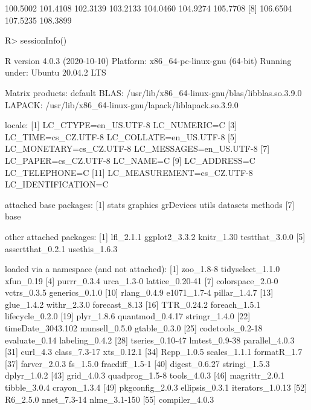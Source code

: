 \documentclass{article}\usepackage[]{graphicx}\usepackage[]{color}
\begin{document}
\begin{Schunk}
% --begin: "frbe"
\begin{Soutput}
 [1] 100.5002 101.4108 102.3139 103.2133 104.0460 104.9274 105.7708
 [8] 106.6504 107.5235 108.3899
\end{Soutput}
%
% --end: "frbe"
\end{Schunk}

\begin{Schunk}
\begin{Sinput}
R> sessionInfo()
\end{Sinput}
\begin{Soutput}
R version 4.0.3 (2020-10-10)
Platform: x86_64-pc-linux-gnu (64-bit)
Running under: Ubuntu 20.04.2 LTS

Matrix products: default
BLAS:   /usr/lib/x86_64-linux-gnu/blas/libblas.so.3.9.0
LAPACK: /usr/lib/x86_64-linux-gnu/lapack/liblapack.so.3.9.0

locale:
 [1] LC_CTYPE=en_US.UTF-8       LC_NUMERIC=C              
 [3] LC_TIME=cs_CZ.UTF-8        LC_COLLATE=en_US.UTF-8    
 [5] LC_MONETARY=cs_CZ.UTF-8    LC_MESSAGES=en_US.UTF-8   
 [7] LC_PAPER=cs_CZ.UTF-8       LC_NAME=C                 
 [9] LC_ADDRESS=C               LC_TELEPHONE=C            
[11] LC_MEASUREMENT=cs_CZ.UTF-8 LC_IDENTIFICATION=C       

attached base packages:
[1] stats     graphics  grDevices utils     datasets  methods  
[7] base     

other attached packages:
[1] lfl_2.1.1        ggplot2_3.3.2    knitr_1.30       testthat_3.0.0  
[5] assertthat_0.2.1 usethis_1.6.3   

loaded via a namespace (and not attached):
 [1] zoo_1.8-8         tidyselect_1.1.0  xfun_0.19        
 [4] purrr_0.3.4       urca_1.3-0        lattice_0.20-41  
 [7] colorspace_2.0-0  vctrs_0.3.5       generics_0.1.0   
[10] rlang_0.4.9       e1071_1.7-4       pillar_1.4.7     
[13] glue_1.4.2        withr_2.3.0       forecast_8.13    
[16] TTR_0.24.2        foreach_1.5.1     lifecycle_0.2.0  
[19] plyr_1.8.6        quantmod_0.4.17   stringr_1.4.0    
[22] timeDate_3043.102 munsell_0.5.0     gtable_0.3.0     
[25] codetools_0.2-18  evaluate_0.14     labeling_0.4.2   
[28] tseries_0.10-47   lmtest_0.9-38     parallel_4.0.3   
[31] curl_4.3          class_7.3-17      xts_0.12.1       
[34] Rcpp_1.0.5        scales_1.1.1      formatR_1.7      
[37] farver_2.0.3      fs_1.5.0          fracdiff_1.5-1   
[40] digest_0.6.27     stringi_1.5.3     dplyr_1.0.2      
[43] grid_4.0.3        quadprog_1.5-8    tools_4.0.3      
[46] magrittr_2.0.1    tibble_3.0.4      crayon_1.3.4     
[49] pkgconfig_2.0.3   ellipsis_0.3.1    iterators_1.0.13 
[52] R6_2.5.0          nnet_7.3-14       nlme_3.1-150     
[55] compiler_4.0.3   
\end{Soutput}
\end{Schunk}
\end{document}

